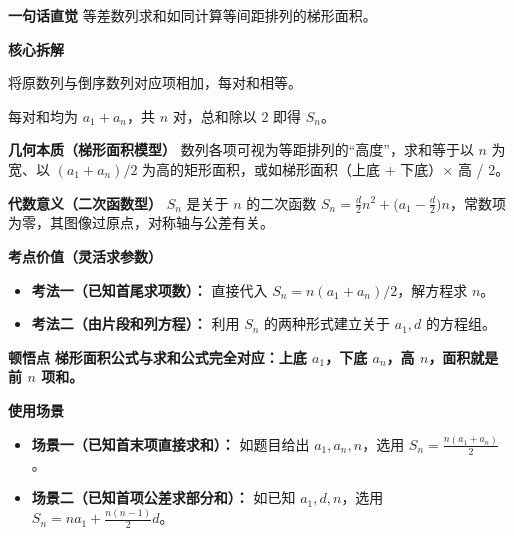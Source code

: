 \begin{explanationbox}
\textbf{\textcolor{CExplanation}{一句话直觉}}
等差数列求和如同计算等间距排列的梯形面积。

\medskip
\textbf{\textcolor{CExplanation}{核心拆解}}
\begin{description}[style=nextline, leftmargin=2.8em, labelsep=0.5em, itemsep=0.45em]
    \item[\textbf{要点一（倒序相加）：}] 将原数列与倒序数列对应项相加，每对和相等。
    \item[\textbf{要点二（首尾平均）：}] 每对和均为 $a_1+a_n$，共 $n$ 对，总和除以 $2$ 即得 $S_n$。
\end{description}

\medskip
\textbf{\textcolor{CExplanation}{几何本质（梯形面积模型）}}
数列各项可视为等距排列的“高度”，求和等于以 $n$ 为宽、以 $(a_1+a_n)/2$ 为高的矩形面积，或如梯形面积（上底 + 下底）$\times$ 高 / 2。

\medskip
\textbf{\textcolor{CExplanation}{代数意义（二次函数型）}}
$S_n$ 是关于 $n$ 的二次函数 $S_n = \frac{d}{2}n^2 + \bigl(a_1 - \frac{d}{2}\bigr)n$，常数项为零，其图像过原点，对称轴与公差有关。

\medskip
\textbf{\textcolor{CExplanation}{考点价值（灵活求参数）}}
\begin{itemize}[leftmargin=*, itemsep=0.5em, topsep=0.4em]
    \item \textbf{考法一（已知首尾求项数）：} 直接代入 $S_n = n(a_1+a_n)/2$，解方程求 $n$。
    \item \textbf{考法二（由片段和列方程）：} 利用 $S_n$ 的两种形式建立关于 $a_1,d$ 的方程组。
\end{itemize}

\medskip
\textbf{\textcolor{CExplanation}{顿悟点}}
\textbf{梯形面积公式与求和公式完全对应：上底 $a_1$，下底 $a_n$，高 $n$，面积就是前 $n$ 项和。}

\medskip
\textbf{\textcolor{CExplanation}{使用场景}}
\begin{itemize}[leftmargin=*, itemsep=0.5em, topsep=0.4em]
    \item \textbf{场景一（已知首末项直接求和）：} 如题目给出 $a_1,a_n,n$，选用 $S_n = \frac{n(a_1+a_n)}{2}$。
    \item \textbf{场景二（已知首项公差求部分和）：} 如已知 $a_1,d,n$，选用 $S_n = na_1 + \frac{n(n-1)}{2}d$。
\end{itemize}
\end{explanationbox}
